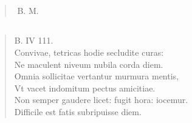 \documentclass[11pt, a4paper]{report}
\begin{document}
            \subsection*{}
      \begin{verse}
      \end{verse}
  
            \subsection*{}
      \begin{verse}
        ﻿\pagebreak 
     \marginpar{[419]} B. M. \\ 
      \end{verse}
  
            \subsection*{}
      \begin{verse}
      B. IV 111. \\ Convivae, tetricas hodie secludite curas: \\ Ne maculent niveum nubila corda diem. \\ Omnia sollicitae vertantur murmura mentis, \\ Vt vacet indomitum pectus amicitiae. \\ Non semper gaudere licet: fugit hora: iocemur. \\ Difficile est fatis subripuisse diem. \\ 
      \end{verse}
  
\end{document}
